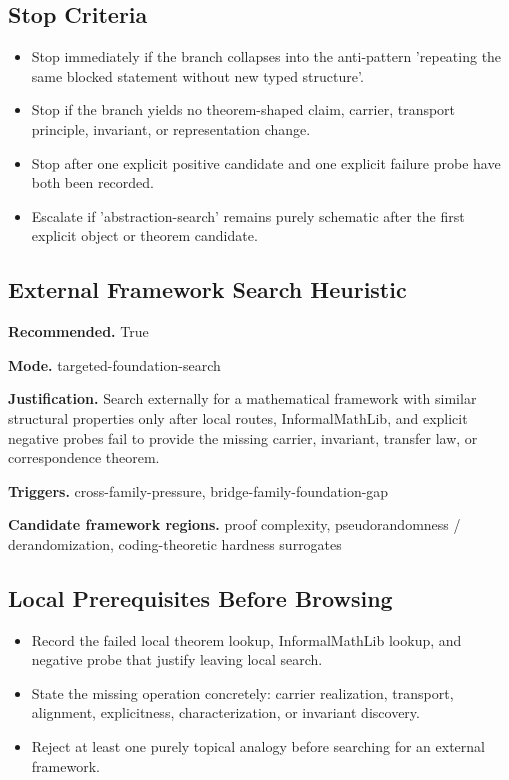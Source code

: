 \documentclass[11pt]{article}
\begin{document}
\subsection*{Stop Criteria}
\begin{itemize}[leftmargin=*,itemsep=0.2em]
\item Stop immediately if the branch collapses into the anti-pattern 'repeating the same blocked statement without new typed structure'.
\item Stop if the branch yields no theorem-shaped claim, carrier, transport principle, invariant, or representation change.
\item Stop after one explicit positive candidate and one explicit failure probe have both been recorded.
\item Escalate if 'abstraction-search' remains purely schematic after the first explicit object or theorem candidate.
\end{itemize}
\subsection*{External Framework Search Heuristic}
\textbf{Recommended.} True

\textbf{Mode.} targeted-foundation-search

\textbf{Justification.} Search externally for a mathematical framework with similar structural properties only after local routes, InformalMathLib, and explicit negative probes fail to provide the missing carrier, invariant, transfer law, or correspondence theorem.

\textbf{Triggers.} cross-family-pressure, bridge-family-foundation-gap

\textbf{Candidate framework regions.} proof complexity, pseudorandomness / derandomization, coding-theoretic hardness surrogates

\subsection*{Local Prerequisites Before Browsing}
\begin{itemize}[leftmargin=*,itemsep=0.2em]
\item Record the failed local theorem lookup, InformalMathLib lookup, and negative probe that justify leaving local search.
\item State the missing operation concretely: carrier realization, transport, alignment, explicitness, characterization, or invariant discovery.
\item Reject at least one purely topical analogy before searching for an external framework.
\end{itemize}
\end{document}
